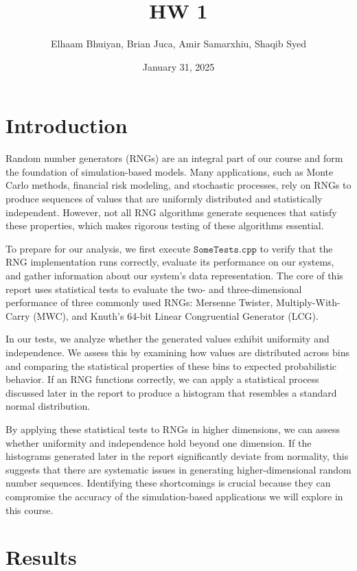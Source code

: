 \documentclass{article}
\title{HW 1}
\author{
Elhaam Bhuiyan,
Brian Juca,
Amir Samarxhiu,
Shaqib Syed
}
\date{January 31, 2025}
\begin{document}
\maketitle

\section*{Introduction}

\hspace{1.5em} Random number generators (RNGs) are an integral part of our course and form the foundation of simulation-based models. Many applications, such as Monte Carlo methods, financial risk modeling, and stochastic processes, rely on RNGs to produce sequences of values that are uniformly distributed and statistically independent. However, not all RNG algorithms generate sequences that satisfy these properties, which makes rigorous testing of these algorithms essential.

To prepare for our analysis, we first execute \(\texttt{SomeTests.cpp}\) to verify that the RNG implementation runs correctly, evaluate its performance on our systems, and gather information about our system's data representation. The core of this report uses statistical tests to evaluate the two- and three-dimensional performance of three commonly used RNGs: Mersenne Twister, Multiply-With-Carry (MWC), and Knuth's 64-bit Linear Congruential Generator (LCG).

In our tests, we analyze whether the generated values exhibit uniformity and independence. We assess this by examining how values are distributed across bins and comparing the statistical properties of these bins to expected probabilistic behavior. If an RNG functions correctly, we can apply a statistical process discussed later in the report to produce a histogram that resembles a standard normal distribution.

By applying these statistical tests to RNGs in higher dimensions, we can assess whether uniformity and independence hold beyond one dimension. If the histograms generated later in the report significantly deviate from normality, this suggests that there are systematic issues in generating higher-dimensional random number sequences. Identifying these shortcomings is crucial because they can compromise the accuracy of the simulation-based applications we will explore in this course.

\section*{Results}
\end{document}
